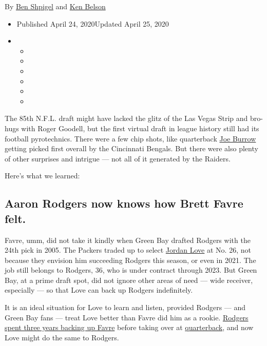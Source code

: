 By \href{https://www.nytimes3xbfgragh.onion/by/ben-shpigel}{Ben Shpigel}
and \href{https://www.nytimes3xbfgragh.onion/by/ken-belson}{Ken Belson}

\begin{itemize}
\item
  Published April 24, 2020Updated April 25, 2020
\item
  \begin{itemize}
  \item
  \item
  \item
  \item
  \item
  \item
  \end{itemize}
\end{itemize}

The 85th N.F.L. draft might have lacked the glitz of the Las Vegas Strip
and bro-hugs with Roger Goodell, but the first virtual draft in league
history still had its football pyrotechnics. There were a few chip
shots, like quarterback
\href{https://www.nytimes3xbfgragh.onion/article/joe-burrow-nfl-draft.html}{Joe
Burrow} getting picked first overall by the Cincinnati Bengals. But
there were also plenty of other surprises and intrigue --- not all of it
generated by the Raiders.

Here's what we learned:

\hypertarget{aaron-rodgers-now-knows-how-brett-favre-felt}{%
\subsection{Aaron Rodgers now knows how Brett Favre
felt.}\label{aaron-rodgers-now-knows-how-brett-favre-felt}}

Favre, umm, did not take it kindly when Green Bay drafted Rodgers with
the 24th pick in 2005. The Packers traded up to select
\href{https://www.nytimes3xbfgragh.onion/article/jordan-love.html}{Jordan
Love} at No. 26, not because they envision him succeeding Rodgers this
season, or even in 2021. The job still belongs to Rodgers, 36, who is
under contract through 2023. But Green Bay, at a prime draft spot, did
not ignore other areas of need --- wide receiver, especially --- so that
Love can back up Rodgers indefinitely.

It is an ideal situation for Love to learn and listen, provided Rodgers
--- and Green Bay fans --- treat Love better than Favre did him as a
rookie.
\href{https://www.nytimes3xbfgragh.onion/2011/12/03/sports/football/the-education-of-the-packers-aaron-rodgers.html}{Rodgers
spent three years backing up Favre} before taking over at
\href{https://www.nytimes3xbfgragh.onion/2020/08/31/sports/football/nfl-quarterback-controversies.html}{quarterback},
and now Love might do the same to Rodgers.

